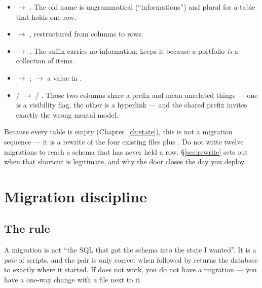 \begin{itemize}
  \item {} $\rightarrow$ . The old name is ungrammatical
    (``informations'') and plural for a table that holds one row.
  \item {} $\rightarrow$ , restructured from columns
    to rows.
  \item {} $\rightarrow$ . The  suffix carries
    no information;  keeps it because a portfolio \emph{is} a collection of
    items.
  \item {} $\rightarrow$ ;  $\rightarrow$ a
     value in .
  \item {} /  $\rightarrow$  / .
    Those two columns share a prefix and mean unrelated things --- one is a visibility flag, the
    other is a hyperlink --- and the shared prefix invites exactly the wrong mental model.
\end{itemize}

\begin{pattern}
Because every table is empty (Chapter~\ref{ch:state}), this is not a migration sequence --- it is a
rewrite of the four existing  files plus . Do not write
twelve  migrations to reach a schema that has never held a row.
\S\ref{sec:rewrite} sets out when that shortcut is legitimate, and why the door closes the day you
deploy.
\end{pattern}

\chapter{Migration discipline}
\label{ch:migrations}

\section{The rule}

\begin{keyidea}
A migration is not ``the SQL that got the schema into the state I wanted''. It is a \emph{pair} of
scripts, and the pair is only correct when  followed by  returns the database
to exactly where it started. If  does not work, you do not have a migration --- you have
a one-way change with a file next to it.
\end{keyidea}

